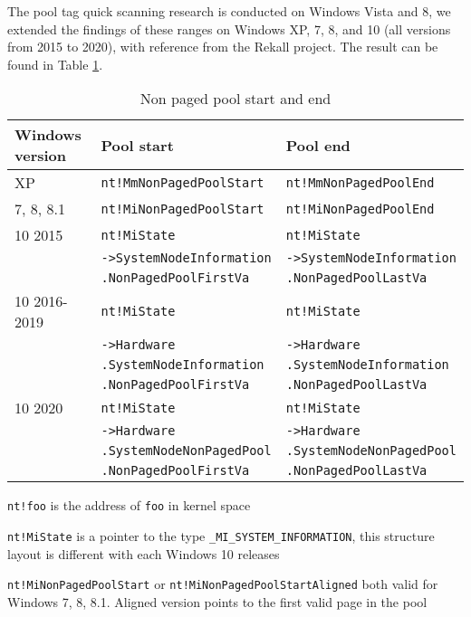 The pool tag quick scanning research is conducted on Windows Vista and 8, we
extended the findings of these ranges on Windows XP, 7, 8, and 10 (all versions
from 2015 to 2020), with reference from the Rekall project. The result can be
found in Table \ref{tab:nonpaged}.

\begin{table}[]
\begin{tabular}{lll}
\hline
Windows version & Pool start                      & Pool end                      \\ \hline
XP              & \texttt{nt!MmNonPagedPoolStart} & \texttt{nt!MmNonPagedPoolEnd} \\
7, 8, 8.1       & \texttt{nt!MiNonPagedPoolStart} & \texttt{nt!MiNonPagedPoolEnd} \\
10 2015         & \texttt{nt!MiState}
                & \texttt{nt!MiState} \\
                & \texttt{->SystemNodeInformation}
                & \texttt{->SystemNodeInformation} \\
                & \texttt{.NonPagedPoolFirstVa}
                & \texttt{.NonPagedPoolLastVa} \\
10 2016-2019    & \texttt{nt!MiState}
                & \texttt{nt!MiState} \\
                & \texttt{->Hardware}
                & \texttt{->Hardware} \\
                & \texttt{.SystemNodeInformation}
                & \texttt{.SystemNodeInformation} \\
                & \texttt{.NonPagedPoolFirstVa}
                & \texttt{.NonPagedPoolLastVa} \\
10 2020         & \texttt{nt!MiState}
                & \texttt{nt!MiState} \\
                & \texttt{->Hardware}
                & \texttt{->Hardware} \\
                & \texttt{.SystemNodeNonPagedPool}
                & \texttt{.SystemNodeNonPagedPool} \\
                & \texttt{.NonPagedPoolFirstVa}
                & \texttt{.NonPagedPoolLastVa} \\ \hline
\end{tabular}
  {\raggedright \texttt{nt!foo} is the address of \texttt{foo} in kernel space
    \par}
  {\raggedright \texttt{nt!MiState} is a pointer to the type
  \texttt{\_MI\_SYSTEM\_INFORMATION}, this structure layout is different with
  each Windows 10 releases \par}
  {\raggedright \texttt{nt!MiNonPagedPoolStart} or
  \texttt{nt!MiNonPagedPoolStartAligned} both valid for Windows 7, 8, 8.1. Aligned
  version points to the first valid page in the pool \par}

  \caption{Non paged pool start and end}
  \label{tab:nonpaged}
\end{table}

